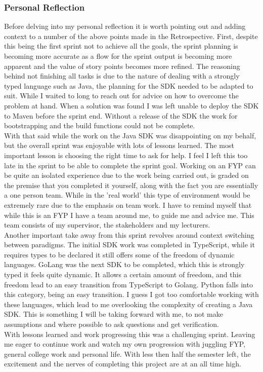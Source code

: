 \subsubsection{Personal Reflection}
Before delving into my personal reflection it is worth pointing out and adding context to a number of the above points made in the Retrospective. First, despite this being the first sprint not to achieve all the goals, the sprint planning is becoming more accurate as a flow for the sprint output is becoming more apparent and the value of story points becomes more refined. The reasoning behind not finishing all tasks is due to the nature of dealing with a strongly typed language such as Java, the planning for the SDK needed to be adapted to suit. While I waited to long to reach out for advice on how to overcome the problem at hand. When a solution was found I was left unable to deploy the SDK to Maven before the sprint end. Without a release of the SDK the work for bootstrapping and the build functions could not be complete.
\\With that said while the work on the Java SDK was disappointing on my behalf, but the overall sprint was enjoyable with lots of lessons learned. The most important lesson is choosing the right time to ask for help. I feel I left this too late in the sprint to be able to complete the sprint goal. Working on an FYP can be quite an isolated experience due to the work being carried out, is graded on the premise that you completed it yourself, along with the fact you are essentially a one person team. While in the 'real world' this type of environment would be extremely rare due to the emphasis on team work. I have to remind myself that while this is an FYP I have a team around me, to guide me and advice me. This team consists of my supervisor, the stakeholders and my lecturers.
\\Another important take away from this sprint revolves around context switching between paradigms. The initial SDK work was completed in TypeScript, while it requires types to be declared it still offers some of the freedom of dynamic languages. GoLang was the next SDK to be completed, which this is strongly typed it feels quite dynamic. It allows a certain amount of freedom, and this freedom lead to an easy transition from TypeScript to Golang. Python falls into this category, being an easy transition. I guess I got too comfortable working with these languages, which lead to me overlooking the complexity of creating a Java SDK. This is something I will be taking forward with me, to not make assumptions and where possible to ask questions and get verification.
\\With lessons learned and work progressing this was a challenging sprint. Leaving me eager to continue work and watch my own progression with juggling FYP, general college work and personal life. With less then half the semester left, the excitement and the nerves of completing this project are at an all time high. 
